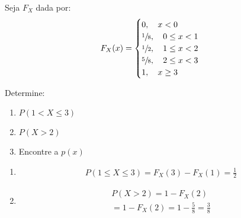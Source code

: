 \begin{description}
         \item  [Exemplo:]
         \item  Seja $F_{X}$ dada por:
           \begin{align*}
             F_{X}(x)=\begin{cases} 
               0, \quad x<0 \\
               \sfrac{1}{8},\quad 0 \le x <1 \\
               \sfrac{1}{2}, \quad 1 \le x < 2 \\
               \sfrac{5}{8}, \quad 2 \le x < 3 \\
               1,\quad  x \geq 3
             \end{cases}
           \end{align*}

           Determine: 
           \begin{enumerate}[label=(\alph*)]
             \item $P(1 < X \le 3)$
             \item $P(X>2)$
             \item Encontre a $p(x)$
           \end{enumerate}
           \begin{enumerate}[label= (\alph*)]
             \item 
               \begin{align*}
                 P(1 \le X \le 3)= F_{X}(3) - F_{X}(1) = \frac{1}{2}
               \end{align*}
             \item 
               \begin{align*}
                 P( X > 2)=1 - F_{X}(2) \\
                 = 1- F_{X}(2)= 1 - \frac{5}{8}= \frac{3}{8}
               \end{align*}


\end{enumerate}
\end{description}
